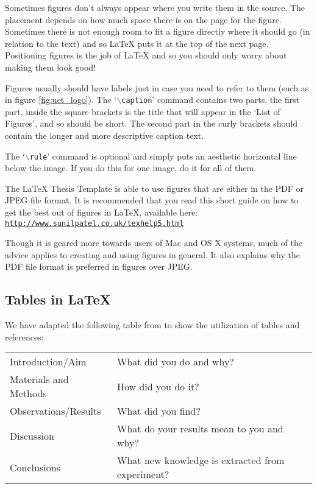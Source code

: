 Sometimes figures don't always appear where you write them in the source. The placement depends on how much space there is on the page for the figure. Sometimes there is not enough room to fit a figure directly where it should go (in relation to the text) and so \LaTeX{} puts it at the top of the next page. Positioning figures is the job of \LaTeX{} and so you should only worry about making them look good!

Figures usually should have labels just in case you need to refer to them (such as in figure \ref{fig:uet_logo}). The `$\backslash$\texttt{caption}' command contains two parts, the first part, inside the square brackets is the title that will appear in the `List of Figures', and so should be short. The second part in the curly brackets should contain the longer and more descriptive caption text.

The `$\backslash$\texttt{rule}' command is optional and simply puts an aesthetic horizontal line below the image. If you do this for one image, do it for all of them.

The \LaTeX{} Thesis Template is able to use figures that are either in the PDF or JPEG file format. It is recommended that you read this short guide on how to get the best out of figures in \LaTeX{}, available here:\\
\href{http://www.sunilpatel.co.uk/texhelp5.html}{\texttt{http://www.sunilpatel.co.uk/texhelp5.html}}

Though it is geared more towards users of Mac and OS X systems, much of the advice applies to creating and using figures in general. It also explains why the PDF file format is preferred in figures over JPEG.
\subsection{Tables in \LaTeX{}}
We have adapted the following table from \cite{barrass2002scientists} to show the utilization of tables and references:

\begin{table}[h]
\centering
\begin{tabular}{l|l} \hline
Introduction/Aim  & What did you do and why? \\
Materials and Methods & How did you do it? \\
Observations/Results & What did you find? \\
Discussion & What do your results mean to you and why? \\
Conclusions & What new knowledge is extracted from experiment? \\ \hline
\end{tabular}
\label{tab:logic_flow}
\end{table}

